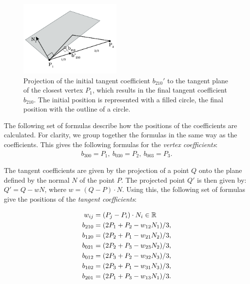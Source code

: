 	\begin{figure}
		\centering
		\includegraphics[width=0.45\textwidth]{./content/img/method/geometry_computation.png}
		\caption{Projection of the initial tangent coefficient $b_{210}'$ to the tangent plane of the closest vertex $P_1$, which results in the final tangent coefficient $b_{210}$. The initial position is represented with a filled circle, the final position with the outline of a circle.}
		\label{fig:method:geometry_tangent_projection.png}
	\end{figure}


	The following set of formulas describe how the positions of the coefficients are calculated. For clarity, we group together the formulas in the same way as the coefficients. This gives the following formulas for the \textit{vertex coefficients}:
	\begin{align}\label{eq:method:vertex_coefficients}
		b_{300} = P_1,\ b_{030} = P_2,\ b_{003} = P_3.
	\end{align}

	The tangent coefficients are given by the projection of a point $Q$ onto the plane defined by the normal $N$ of the point $P$. The projected point $Q'$ is then given by: $Q' = Q - wN$, where $w = (Q - P) \cdot N$. Using this, the following set of formulas give the positions of the \textit{tangent coefficients}:

	\begin{align}\label{eq:method:tangent_coefficients}
		w_{ij} = {}& (P_j - P_i) \cdot N_i \in \mathbb{R} \nonumber\\
		b_{210} = {}& (2 P_1 + P_2 - w_{12}N_1) / 3,\nonumber\\
		b_{120} = {}& (2 P_2 + P_1 - w_{21}N_2) / 3,\nonumber\\
		b_{021} = {}& (2 P_2 + P_3 - w_{23}N_2) / 3, \\
		b_{012} = {}& (2 P_3 + P_2 - w_{32}N_3) / 3,\nonumber\\
		b_{102} = {}& (2 P_3 + P_1 - w_{31}N_3) / 3,\nonumber\\
		b_{201} = {}& (2 P_1 + P_3 - w_{13}N_1) / 3. \nonumber
	\end{align}

